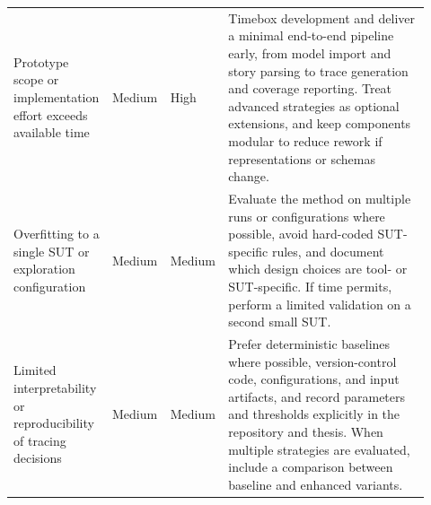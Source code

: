 \begin{table}[h!tb]
\begin{tabular}{p{0.20\linewidth} p{0.12\linewidth} p{0.12\linewidth} p{0.48\linewidth}}
Prototype scope or implementation effort exceeds available time &
Medium & High &
Timebox development and deliver a minimal end-to-end pipeline early, from model import and story parsing to trace generation and coverage reporting. Treat advanced strategies as optional extensions, and keep components modular to reduce rework if representations or schemas change. \\

Overfitting to a single SUT or exploration configuration &
Medium & Medium &
Evaluate the method on multiple runs or configurations where possible, avoid hard-coded SUT-specific rules, and document which design choices are tool- or SUT-specific. If time permits, perform a limited validation on a second small SUT. \\

Limited interpretability or reproducibility of tracing decisions &
Medium & Medium &
Prefer deterministic baselines where possible, version-control code, configurations, and input artifacts, and record parameters and thresholds explicitly in the repository and thesis. When multiple strategies are evaluated, include a comparison between baseline and enhanced variants. \\

\bottomrule
\end{tabular}
\end{table}





